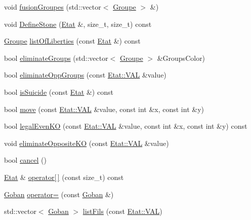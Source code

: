 \begin{DoxyCompactItemize}
void \hyperlink{class_goban_abc771312b6931c4217285ee1b306e51b}{fusion\+Groupes} (std\+::vector$<$ \hyperlink{class_groupe}{Groupe} $>$ \&)
\item 
void \hyperlink{class_goban_a0e2596110cdbb9b007b2b2fd8d5a9973}{Define\+Stone} (\hyperlink{class_etat}{Etat} \&, size\+\_\+t, size\+\_\+t) const
\item 
\hyperlink{class_groupe}{Groupe} \hyperlink{class_goban_a84f36324eb9ddc29f522d481f04c13e7}{list\+Of\+Liberties} (const \hyperlink{class_etat}{Etat} \&) const
\item 
bool \hyperlink{class_goban_a1ec70508987f66afff5f8df381731fac}{eliminate\+Groups} (std\+::vector$<$ \hyperlink{class_groupe}{Groupe} $>$ \&Groups\+Color)
\item 
bool \hyperlink{class_goban_a7858b815885e4af36f05f9d26182cb07}{eliminate\+Opp\+Groups} (const \hyperlink{class_etat_af3ddb2296ffc379b7f3ad2bf832f294e}{Etat\+::\+V\+AL} \&value)
\item 
bool \hyperlink{class_goban_a8b95ea2b51c078381562e361ff7febac}{is\+Suicide} (const \hyperlink{class_etat}{Etat} \&) const
\item 
bool \hyperlink{class_goban_a7dd1a7b53322bde2a831a923059e43a3}{move} (const \hyperlink{class_etat_af3ddb2296ffc379b7f3ad2bf832f294e}{Etat\+::\+V\+AL} \&value, const int \&x, const int \&y)
\item 
bool \hyperlink{class_goban_a799390f04139eec16f7bb8c79b381303}{legal\+Even\+KO} (const \hyperlink{class_etat_af3ddb2296ffc379b7f3ad2bf832f294e}{Etat\+::\+V\+AL} \&value, const int \&x, const int \&y) const
\item 
void \hyperlink{class_goban_a6c4b62a9469b3876d250ab94bcd562e5}{eliminate\+Opposite\+KO} (const \hyperlink{class_etat_af3ddb2296ffc379b7f3ad2bf832f294e}{Etat\+::\+V\+AL} \&value)
\item 
bool \hyperlink{class_goban_ae7ee3b39f3c0d28c9bca286ca538f8ac}{cancel} ()
\item 
\hyperlink{class_etat}{Etat} \& \hyperlink{class_goban_a39eb0323bdb4f3cb5fc00719dd47f938}{operator\mbox{[}$\,$\mbox{]}} (const size\+\_\+t) const
\item 
\hyperlink{class_goban}{Goban} \hyperlink{class_goban_af02f839ac464fc547dd98bc44bae1ef8}{operator=} (const \hyperlink{class_goban}{Goban} \&)
\item 
std\+::vector$<$ \hyperlink{class_goban}{Goban} $>$ \hyperlink{class_goban_a36ab256c9430e070b620052a0f13f051}{list\+Fils} (const \hyperlink{class_etat_af3ddb2296ffc379b7f3ad2bf832f294e}{Etat\+::\+V\+AL})
\end{DoxyCompactItemize}


